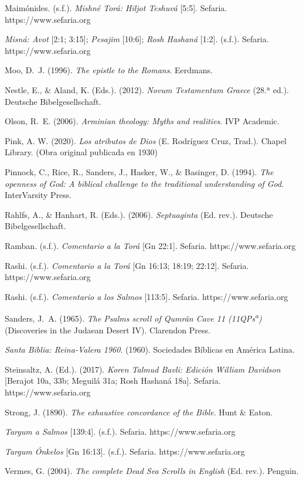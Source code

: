 \documentclass[11pt,letterpaper]{article}
\newcommand{\refapa}[1]{\par{\RaggedRight\hangindent=1.27cm\hangafter=1\noindent #1\par}\vspace{4pt}}
\begin{document}
\refapa{Maimónides. (s.f.). \emph{Mishné Torá: Hiljot Teshuvá} [5:5]. Sefaria. https://www.sefaria.org}
\refapa{\emph{Misná: Avot} [2:1; 3:15]; \emph{Pesajim} [10:6]; \emph{Rosh Hashaná} [1:2]. (s.f.). Sefaria. https://www.sefaria.org}
\refapa{Moo, D.~J. (1996). \emph{The epistle to the Romans}. Eerdmans.}
\refapa{Nestle, E., \& Aland, K. (Eds.). (2012). \emph{Novum Testamentum Graece} (28.ª ed.). Deutsche Bibelgesellschaft.}
\refapa{Olson, R.~E. (2006). \emph{Arminian theology: Myths and realities}. IVP Academic.}
\refapa{Pink, A. W. (2020). \emph{Los atributos de Dios} (E. Rodríguez Cruz, Trad.). Chapel Library. (Obra original publicada en 1930)}
\refapa{Pinnock, C., Rice, R., Sanders, J., Hasker, W., \& Basinger, D. (1994). \emph{The openness of God: A biblical challenge to the traditional understanding of God}. InterVarsity Press.}
\refapa{Rahlfs, A., \& Hanhart, R. (Eds.). (2006). \emph{Septuaginta} (Ed. rev.). Deutsche Bibelgesellschaft.}
\refapa{Ramban. (s.f.). \emph{Comentario a la Torá} [Gn 22:1]. Sefaria. https://www.sefaria.org}
\refapa{Rashi. (s.f.). \emph{Comentario a la Torá} [Gn 16:13; 18:19; 22:12]. Sefaria. https://www.sefaria.org}
\refapa{Rashi. (s.f.). \emph{Comentario a los Salmos} [113:5]. Sefaria. https://www.sefaria.org}
\refapa{Sanders, J.~A. (1965). \emph{The Psalms scroll of Qumrân Cave 11 (11QPs\textsuperscript{a})} (Discoveries in the Judaean Desert IV). Clarendon Press.}
\refapa{\emph{Santa Biblia: Reina-Valera 1960}. (1960). Sociedades Bíblicas en América Latina.}
\refapa{Steinsaltz, A. (Ed.). (2017). \emph{Koren Talmud Bavli: Edición William Davidson} [Berajot 10a, 33b; Meguilá 31a; Rosh Hashaná 18a]. Sefaria. https://www.sefaria.org}
\refapa{Strong, J. (1890). \emph{The exhaustive concordance of the Bible}. Hunt \& Eaton.}
\refapa{\emph{Targum a Salmos} [139:4]. (s.f.). Sefaria. https://www.sefaria.org}
\refapa{\emph{Targum Ónkelos} [Gn 16:13]. (s.f.). Sefaria. https://www.sefaria.org}
\refapa{Vermes, G. (2004). \emph{The complete Dead Sea Scrolls in English} (Ed. rev.). Penguin.}
\end{document}
